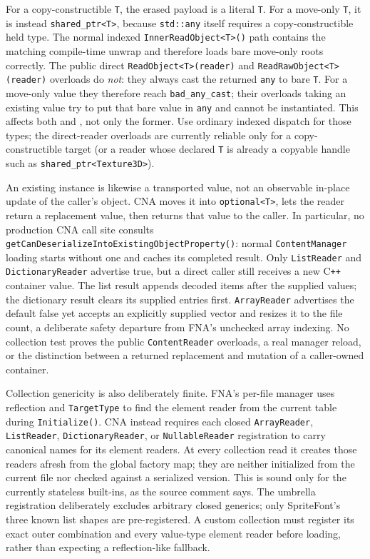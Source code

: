 For a copy-constructible \texttt{T}, the erased payload is a literal \texttt{T}. For a move-only
\texttt{T}, it is instead \texttt{shared\_ptr<T>}, because \texttt{std::any} itself requires a
copy-constructible held type. The normal indexed \texttt{InnerReadObject<T>()} path contains the
matching compile-time unwrap and therefore loads bare move-only roots correctly. The public direct
\texttt{ReadObject<T>(reader)} and \texttt{ReadRawObject<T>(reader)} overloads do \emph{not}:
they always cast the returned \texttt{any} to bare \texttt{T}. For a move-only value they therefore
reach \texttt{bad\_any\_cast}; their overloads taking an existing value try to put that bare value
in \texttt{any} and cannot be instantiated. This affects both  and
, not only the former. Use ordinary indexed dispatch for those types; the
direct-reader overloads are currently reliable only for a copy-constructible target (or a reader
whose declared \texttt{T} is already a copyable handle such as \texttt{shared\_ptr<Texture3D>}).

An existing instance is likewise a transported value, not an observable in-place update of the
caller's object. CNA moves it into \texttt{optional<T>}, lets the reader return a replacement
value, then returns that value to the caller. In particular, no production CNA call site consults
\texttt{getCanDeserializeIntoExistingObjectProperty()}: normal \texttt{ContentManager} loading
starts without one and caches its completed result. Only \texttt{ListReader} and
\texttt{DictionaryReader} advertise true, but a direct caller still receives a new C\texttt{++}
container value. The list result appends decoded items after the supplied values; the dictionary
result clears its supplied entries first. \texttt{ArrayReader} advertises the default false yet
accepts an explicitly supplied vector and resizes it to the file count, a deliberate safety
departure from FNA's unchecked array indexing. No collection test proves the public
\texttt{ContentReader} overloads, a real manager reload, or the distinction between a returned
replacement and mutation of a caller-owned container.

Collection genericity is also deliberately finite. FNA's per-file manager uses reflection and
\texttt{TargetType} to find the element reader from the current table during \texttt{Initialize()}.
CNA instead requires each closed \texttt{ArrayReader}, \texttt{ListReader},
\texttt{DictionaryReader}, or \texttt{NullableReader} registration to carry canonical names for
its element readers. At every collection read it creates those readers afresh from the global
factory map; they are neither initialized from the current file nor checked against a serialized
version. This is sound only for the currently stateless built-ins, as the source comment says.
The umbrella registration deliberately excludes arbitrary closed generics; only SpriteFont's three
known list shapes are pre-registered. A custom collection must register its exact outer
combination and every value-type element reader before loading, rather than expecting a
reflection-like fallback.

